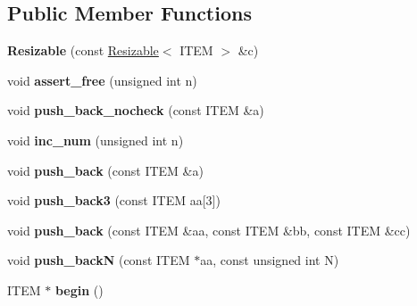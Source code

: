 \subsection*{Public Member Functions}
\begin{DoxyCompactItemize}
\item 
{\bfseries Resizable} (const \hyperlink{classResizable}{Resizable}$<$ I\+T\+EM $>$ \&c)\hypertarget{classResizable_aba8028446270df4bf23f45f75b6f1111}{}\label{classResizable_aba8028446270df4bf23f45f75b6f1111}

\item 
void {\bfseries assert\+\_\+free} (unsigned int n)\hypertarget{classResizable_a8466a5def66b7aa3d46d38ad5e9ac88e}{}\label{classResizable_a8466a5def66b7aa3d46d38ad5e9ac88e}

\item 
void {\bfseries push\+\_\+back\+\_\+nocheck} (const I\+T\+EM \&a)\hypertarget{classResizable_a1d9f9c765303ea7a51f367702a15de9e}{}\label{classResizable_a1d9f9c765303ea7a51f367702a15de9e}

\item 
void {\bfseries inc\+\_\+num} (unsigned int n)\hypertarget{classResizable_a8100310a6897b2f6b1f8d16c4001b547}{}\label{classResizable_a8100310a6897b2f6b1f8d16c4001b547}

\item 
void {\bfseries push\+\_\+back} (const I\+T\+EM \&a)\hypertarget{classResizable_a0186f048b2971dd96be2af79199a15fb}{}\label{classResizable_a0186f048b2971dd96be2af79199a15fb}

\item 
void {\bfseries push\+\_\+back3} (const I\+T\+EM aa\mbox{[}3\mbox{]})\hypertarget{classResizable_a9c2c5cde7de3a4dba0bc481b2ff5add5}{}\label{classResizable_a9c2c5cde7de3a4dba0bc481b2ff5add5}

\item 
void {\bfseries push\+\_\+back} (const I\+T\+EM \&aa, const I\+T\+EM \&bb, const I\+T\+EM \&cc)\hypertarget{classResizable_a9396c2a86fdceebb517c5b0c76bb0552}{}\label{classResizable_a9396c2a86fdceebb517c5b0c76bb0552}

\item 
void {\bfseries push\+\_\+backN} (const I\+T\+EM $\ast$aa, const unsigned int N)\hypertarget{classResizable_ac8156c84f4dfce728ddf544b2b7b2f47}{}\label{classResizable_ac8156c84f4dfce728ddf544b2b7b2f47}

\item 
I\+T\+EM $\ast$ {\bfseries begin} ()\hypertarget{classResizable_aeafaf7c4ddc2eac894115cb98b4df96f}{}\label{classResizable_aeafaf7c4ddc2eac894115cb98b4df96f}


\end{DoxyCompactItemize}
